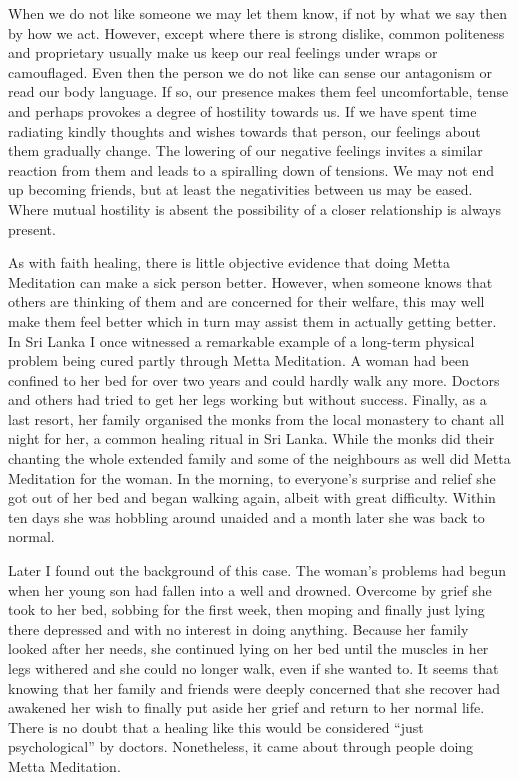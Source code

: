 \documentclass[10pt, openright]{book}
\begin{document}
When we do not like someone we may let them know, if not by what we say then by how we act. However, except where there is strong dislike, common politeness and proprietary usually make us keep our real feelings under wraps or camouflaged. Even then the person we do not like can sense our antagonism or read our body language. If so, our presence makes them feel uncomfortable, tense and perhaps provokes a degree of hostility towards us. If we have spent time radiating kindly thoughts and wishes towards that person, our feelings about them gradually change. The lowering of our negative feelings invites a similar reaction from them and leads to a spiralling down of tensions. We may not end up becoming friends, but at least the negativities between us may be eased. Where mutual hostility is absent the possibility of a closer relationship is always present.


As with faith healing, there is little objective evidence that doing Metta Meditation can make a sick person better. However, when someone knows that others are thinking of them and are concerned for their welfare, this may well make them feel better which in turn may assist them in actually getting better. In Sri Lanka I once witnessed a remarkable example of a long-term physical problem being cured partly through Metta Meditation. A woman had been confined to her bed for over two years and could hardly walk any more. Doctors and others had tried to get her legs working but without success. Finally, as a last resort, her family organised the monks from the local monastery to chant all night for her, a common healing ritual in Sri Lanka. While the monks did their chanting the whole extended family and some of the neighbours as well did Metta Meditation for the woman. In the morning, to everyone’s surprise and relief she got out of her bed and began walking again, albeit with great difficulty. Within ten days she was hobbling around unaided and a month later she was back to normal.


Later I found out the background of this case. The woman’s problems had begun when her young son had fallen into a well and drowned. Overcome by grief she took to her bed, sobbing for the first week, then moping and finally just lying there depressed and with no interest in doing anything. Because her family looked after her needs, she continued lying on her bed until the muscles in her legs withered and she could no longer walk, even if she wanted to. It seems that knowing that her family and friends were deeply concerned that she recover had awakened her wish to finally put aside her grief and return to her normal life. There is no doubt that a healing like this would be considered “just psychological” by doctors. Nonetheless, it came about through people doing Metta Meditation.
\end{document}
